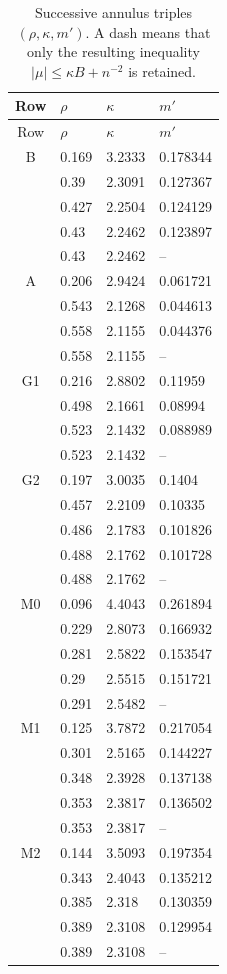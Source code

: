 \documentclass[11pt,reqno]{amsart}
\numberwithin{equation}{section}
\theoremstyle{definition}
\theoremstyle{remark}
\begin{document}
\begin{longtable}{@{}clll@{}}
\caption{Successive annulus triples $(\rho,\kappa,m')$.
A dash means that only the resulting inequality $|\mu|\leq\kappa B+n^{-2}$ is retained.}
\label{bc:annulus-table}\\
\toprule Row&$\rho$&$\kappa$&$m'$\\\midrule\endfirsthead
\toprule Row&$\rho$&$\kappa$&$m'$\\\midrule\endhead
B & 0.169 & 3.2333 & 0.178344\\
 & 0.39 & 2.3091 & 0.127367\\
 & 0.427 & 2.2504 & 0.124129\\
 & 0.43 & 2.2462 & 0.123897\\
 & 0.43 & 2.2462 & --\\
A & 0.206 & 2.9424 & 0.061721\\
 & 0.543 & 2.1268 & 0.044613\\
 & 0.558 & 2.1155 & 0.044376\\
 & 0.558 & 2.1155 & --\\
G1 & 0.216 & 2.8802 & 0.11959\\
 & 0.498 & 2.1661 & 0.08994\\
 & 0.523 & 2.1432 & 0.088989\\
 & 0.523 & 2.1432 & --\\
G2 & 0.197 & 3.0035 & 0.1404\\
 & 0.457 & 2.2109 & 0.10335\\
 & 0.486 & 2.1783 & 0.101826\\
 & 0.488 & 2.1762 & 0.101728\\
 & 0.488 & 2.1762 & --\\
M0 & 0.096 & 4.4043 & 0.261894\\
 & 0.229 & 2.8073 & 0.166932\\
 & 0.281 & 2.5822 & 0.153547\\
 & 0.29 & 2.5515 & 0.151721\\
 & 0.291 & 2.5482 & --\\
M1 & 0.125 & 3.7872 & 0.217054\\
 & 0.301 & 2.5165 & 0.144227\\
 & 0.348 & 2.3928 & 0.137138\\
 & 0.353 & 2.3817 & 0.136502\\
 & 0.353 & 2.3817 & --\\
M2 & 0.144 & 3.5093 & 0.197354\\
 & 0.343 & 2.4043 & 0.135212\\
 & 0.385 & 2.318 & 0.130359\\
 & 0.389 & 2.3108 & 0.129954\\
 & 0.389 & 2.3108 & --\\
\bottomrule\end{longtable}
\end{document}
